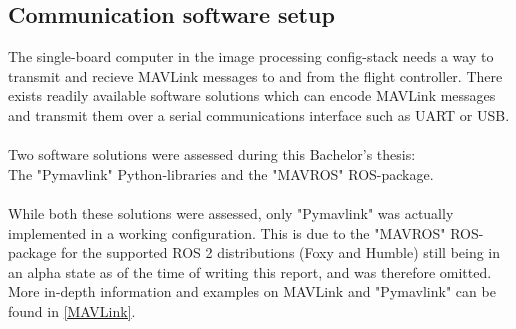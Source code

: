 \subsection{Communication software setup}
The single-board computer in the image processing config-stack needs a way to transmit and recieve MAVLink messages to and from the flight controller. There exists readily available software solutions which can encode MAVLink messages and transmit them over a serial communications interface such as UART or USB.\\\\
Two software solutions were assessed during this Bachelor's thesis:\\
The "Pymavlink" Python-libraries\cite{github-Pymavlink} and the "MAVROS" ROS-package\cite{wiki-MAVROS}.\\\\
While both these solutions were assessed, only "Pymavlink" was actually implemented in a working configuration. This is due to the "MAVROS" ROS-package for the supported ROS 2 distributions (Foxy and Humble) still being in an alpha state\cite{github-MAVROS} as of the time of writing this report, and was therefore omitted.\\
More in-depth information and examples on MAVLink and "Pymavlink" can be found in \ref{MAVLink}.


\newpage







